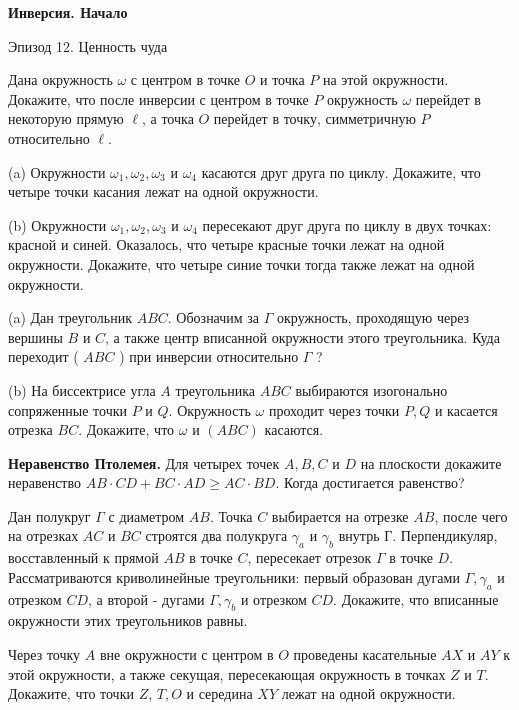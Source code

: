 \centerline{\bf \Huge Инверсия. Начало}

\begin{flushright}
        \scriptsize{Эпизод 12. Ценность чуда}
\end{flushright}

Дана окружность $\omega$ с центром в точке $O$ и точка $P$ на этой окружности. Докажите, что после инверсии с центром в точке $P$ окружность $\omega$ перейдет в некоторую прямую $\ell$, а точка $O$ перейдет в точку, симметричную $P$ относительно $\ell$.

(a) Окружности $\omega_1, \omega_2, \omega_3$ и $\omega_4$ касаются друг друга по циклу. Докажите, что четыре точки касания лежат на одной окружности.

\noindent
(b) Окружности $\omega_1, \omega_2, \omega_3$ и $\omega_4$ пересекают друг друга по циклу в двух точках: красной и синей. Оказалось, что четыре красные точки лежат на одной окружности. Докажите, что четыре синие точки тогда также лежат на одной окружности.

(a) Дан треугольник $A B C$. Обозначим за $\Gamma$ окружность, проходящую через вершины $B$ и $C$, а также центр вписанной окружности этого треугольника. Куда переходит ( $A B C$ ) при инверсии относительно $\Gamma$ ?

\noindent
(b) На биссектрисе угла $A$ треугольника $A B C$ выбираются изогонально сопряженные точки $P$ и $Q$. Окружность $\omega$ проходит через точки $P, Q$ и касается отрезка $B C$. Докажите, что $\omega$ и $(A B C)$ касаются.

\textbf{Неравенство Птолемея.}
Для четырех точек $A, B, C$ и $D$ на плоскости докажите неравенство $A B \cdot C D+B C \cdot A D \geqslant A C \cdot B D$. Когда достигается равенство?

Дан полукруг $\Gamma$ с диаметром $A B$. Точка $C$ выбирается на отрезке $A B$, после чего на отрезках $A C$ и $B C$ строятся два полукруга $\gamma_a$ и $\gamma_b$ внутрь Г. Перпендикуляр, восставленный к прямой $A B$ в точке $C$, пересекает отрезок $\Gamma$ в точке $D$. Рассматриваются криволинейные треугольники: первый образован дугами $\Gamma, \gamma_a$ и отрезком $C D$, а второй - дугами $\Gamma, \gamma_b$ и отрезком $C D$. Докажите, что вписанные окружности этих треугольников равны.

Через точку $A$ вне окружности с центром в $O$ проведены касательные $A X$ и $A Y$ к этой окружности, а также секущая, пересекающая окружность в точках $Z$ и $T$. Докажите, что точки $Z$, $T, O$ и середина $X Y$ лежат на одной окружности.

